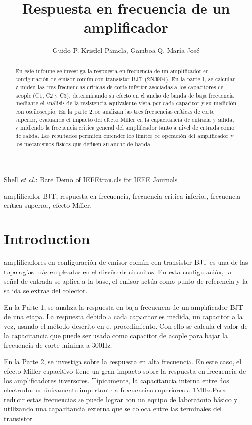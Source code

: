 \documentclass[journal]{IEEEtran}
\begin{document}
\title{Respuesta en frecuencia de un amplificador}
\author{Guido P. Krisdel Pamela, Gamboa Q. María José} 
{Shell \MakeLowercase{\textit{et al.}}: Bare Demo of IEEEtran.cls for IEEE Journals}

\maketitle
\renewcommand{\abstractname}{Resumen}
\begin{abstract}
En este informe se investiga la respuesta en frecuencia de un amplificador en configuración de emisor común con transistor BJT (2N3904). En la parte 1, se calculan y miden las tres frecuencias críticas de corte inferior asociadas a los capacitores de acople (C1, C2 y C3), determinando su efecto en el ancho de banda de baja frecuencia mediante el análisis de la resistencia equivalente vista por cada capacitor y su medición con osciloscopio. En la parte 2, se analizan las tres frecuencias críticas de corte superior, evaluando el impacto del efecto Miller en la capacitancia de entrada y salida, y midiendo la frecuencia crítica general del amplificador tanto a nivel de entrada como de salida. Los resultados permiten entender los límites de operación del amplificador y los mecanismos físicos que definen su ancho de banda. 
\end{abstract}

\renewcommand{\IEEEkeywordsname}{Palabras clave}
\begin{IEEEkeywords}
amplificador BJT, respuesta en frecuencia, frecuencia crítica inferior, frecuencia crítica superior, efecto Miller.
\end{IEEEkeywords}

\IEEEpeerreviewmaketitle

\section{Introduction}
amplificadores en configuración de emisor común con transistor BJT es una de las topologías más empleadas en el diseño de circuitos. En esta configuración, la señal de entrada se aplica a la base, el emisor actúa como punto de referencia y la salida se extrae del colector. 
\par En la Parte 1, se analiza la respuesta en baja frecuencia de un amplificador BJT de una etapa. La respuesta debido a cada capacitor es medida, un capacitor a la vez, usando el método descrito en el procedimiento. Con ello se calcula el valor de la capacitancia que puede ser usada como capacitor de acople para bajar la frecuencia de corte mínima a 300Hz.
\par En la Parte 2, se investiga sobre la respuesta en alta frecuencia. En este caso, el efecto Miller capacitivo tiene un gran impacto sobre la respuesta en frecuencia de los amplificadores inversores. Típicamente, la capacitancia interna entre dos electrodos es únicamente importante a frecuencias superiores a 1MHz.Para reducir estas frecuencias se puede lograr con un equipo de laboratorio básico y utilizando una capacitancia externa que se coloca entre las terminales del transistor.
\end{document}
